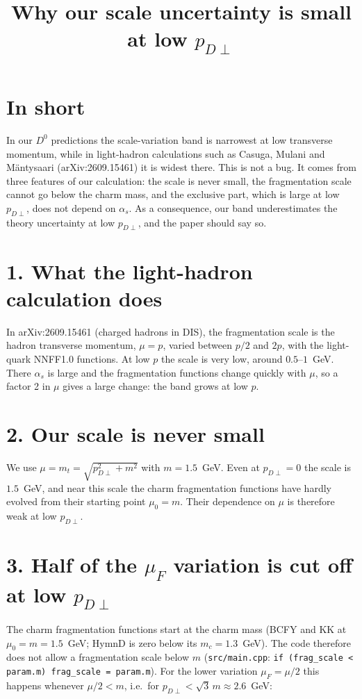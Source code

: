 \documentclass[12pt]{article}
\title{Why our scale uncertainty is small at low $p_{D\perp}$}
\author{}
\date{}
\begin{document}
\maketitle

\section*{In short}

In our $D^0$ predictions the scale-variation band is narrowest at low transverse momentum,
while in light-hadron calculations such as Casuga, Mulani and M\"antysaari
(arXiv:2609.15461) it is widest there. This is not a bug. It comes from three features of our
calculation: the scale is never small, the fragmentation scale cannot go below the charm mass,
and the exclusive part, which is large at low $p_{D\perp}$, does not depend on $\alpha_s$. As a
consequence, our band underestimates the theory uncertainty at low $p_{D\perp}$, and the paper
should say so.

\section*{1. What the light-hadron calculation does}

In arXiv:2609.15461 (charged hadrons in DIS), the fragmentation scale is the hadron transverse
momentum, $\mu=p$, varied between $p/2$ and $2p$, with the light-quark NNFF1.0 functions. At low
$p$ the scale is very low, around $0.5$--$1$~GeV. There $\alpha_s$ is large and the fragmentation
functions change quickly with $\mu$, so a factor 2 in $\mu$ gives a large change: the band grows
at low $p$.

\section*{2. Our scale is never small}

We use $\mu=m_t=\sqrt{p_{D\perp}^2+m^2}$ with $m=1.5$~GeV. Even at $p_{D\perp}=0$ the scale is
$1.5$~GeV, and near this scale the charm fragmentation functions have hardly evolved from their
starting point $\mu_0=m$. Their dependence on $\mu$ is therefore weak at low $p_{D\perp}$.

\section*{3. Half of the $\mu_F$ variation is cut off at low $p_{D\perp}$}

The charm fragmentation functions start at the charm mass (BCFY and KK at $\mu_0=m=1.5$~GeV;
HymnD is zero below its $m_c=1.3$~GeV). The code therefore does not allow a fragmentation scale
below $m$ (\texttt{src/main.cpp}: \texttt{if (frag\_scale < param.m) frag\_scale = param.m}).
For the lower variation $\mu_F=\mu/2$ this happens whenever $\mu/2<m$, i.e.\ for
$p_{D\perp}<\sqrt3\,m\approx2.6$~GeV:
\end{document}
